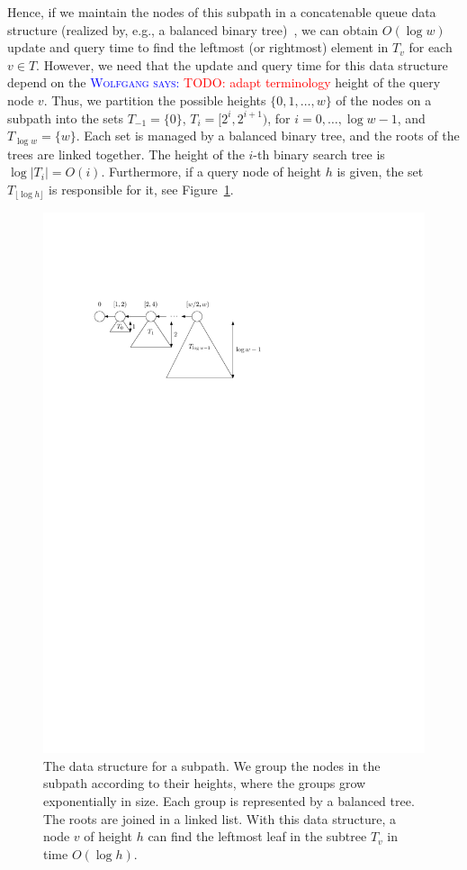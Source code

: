\documentclass[a4paper,11pt]{article}
\newcommand{\?}{\mskip1.5mu}
\newcommand{\aremark}[3]{\textcolor{blue}{\textsc{#1 #2:}}
  \textcolor{red}{\textsf{#3}}}
\newcommand{\wolfgang}[2][says]{\aremark{Wolfgang}{#1}{#2}}
\begin{document}
Hence, if we maintain the nodes of 
this subpath in a concatenable queue data structure
(realized by, e.g., a balanced binary tree)~\cite{PreparateSh85},
we can obtain $O(\log w)$ update and query time
to find the leftmost (or rightmost) element in $T_v$
for each $v \in T$.
However, we need that the update and query time for this
data structure
depend on the \wolfgang{TODO: adapt terminology} height  
of the query node $v$.
Thus, we partition the possible heights
$\{0, 1, \dots, w\}$ of the nodes on a 
subpath into the sets
$T_{-1} = \{0\}$, $T_i =[2^i, 2^{i+1})$, for $i = 0,\dots,\log w-1$, 
and $T_{\log w} = \{w\}$.
Each set is managed by a balanced binary tree, and the 
roots of the trees are linked together. The height of the $i$-th binary 
search tree is $\log |T_i| = O(i)$. Furthermore, if a query node
of height $h$ is given, 
the set $T_{\lfloor \log h \rfloor}$ is responsible for it, see 
Figure~\ref{fig:queryds}.
\begin{figure}
\centering
\includegraphics{queryds}
\caption{The data structure for a subpath. We group the nodes
in the subpath according to their heights, where the groups
grow exponentially in size. Each group is represented by a
balanced tree. The roots are joined in a linked
list. With this data structure, a node $v$ of height $h$ can
find the leftmost leaf in the subtree $T_v$ in time $O(\log h)$.}
\label{fig:queryds}
\end{figure}
\end{document}
